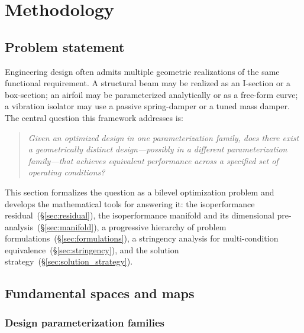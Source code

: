 
\section{Methodology}
\label{sec:methodology}

\subsection{Problem statement}
\label{sec:problem_statement}

Engineering design often admits multiple geometric realizations of the same functional requirement. A structural beam may be realized as an I-section or a box-section; an airfoil may be parameterized analytically or as a free-form curve; a vibration isolator may use a passive spring-damper or a tuned mass damper. The central question this framework addresses is:

\begin{quote}
\emph{Given an optimized design in one parameterization family, does there exist a geometrically distinct design---possibly in a different parameterization family---that achieves equivalent performance across a specified set of operating conditions?}
\end{quote}

This section formalizes the question as a bilevel optimization problem and develops the mathematical tools for answering it: the isoperformance residual~(\S\ref{sec:residual}), the isoperformance manifold and its dimensional pre-analysis~(\S\ref{sec:manifold}), a progressive hierarchy of problem formulations~(\S\ref{sec:formulations}), a stringency analysis for multi-condition equivalence~(\S\ref{sec:stringency}), and the solution strategy~(\S\ref{sec:solution_strategy}).


\subsection{Fundamental spaces and maps}
\label{sec:spaces}

\subsubsection{Design parameterization families}
\label{sec:families}

